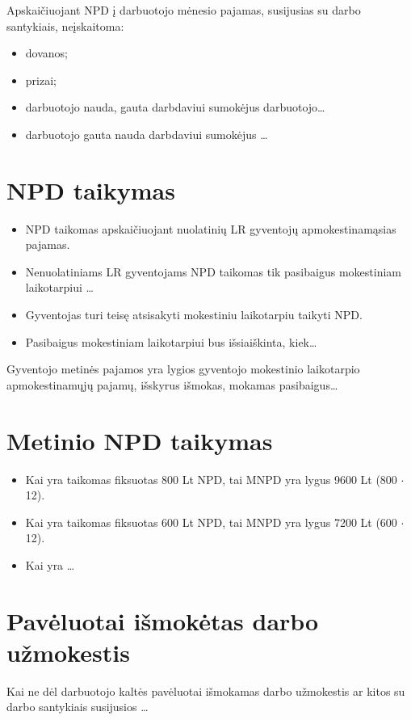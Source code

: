 Apskaičiuojant NPD į darbuotojo mėnesio pajamas, susijusias su darbo
santykiais, neįskaitoma:
\begin{itemize}
  \item dovanos;
  \item prizai;
  \item darbuotojo nauda, gauta darbdaviui sumokėjus darbuotojo…
  \item darbuotojo gauta nauda darbdaviui sumokėjus …
\end{itemize}

\section{NPD taikymas}

\begin{itemize}
  \item NPD taikomas apskaičiuojant nuolatinių LR gyventojų 
    apmokestinamąsias pajamas.
  \item Nenuolatiniams LR gyventojams NPD taikomas tik pasibaigus
    mokestiniam laikotarpiui …
  \item Gyventojas turi teisę atsisakyti mokestiniu laikotarpiu
    taikyti NPD.
  \item Pasibaigus mokestiniam laikotarpiui bus išsiaiškinta, kiek…
\end{itemize}

Gyventojo metinės pajamos yra lygios gyventojo mokestinio laikotarpio
apmokestinamųjų pajamų, išskyrus išmokas, mokamas pasibaigus…

\section{Metinio NPD taikymas}

\begin{itemize}
  \item Kai yra taikomas fiksuotas 800 Lt NPD, tai MNPD yra
    lygus 9600 Lt (800 $\cdot$ 12).
  \item Kai yra taikomas fiksuotas 600 Lt NPD, tai MNPD yra
    lygus 7200 Lt (600 $\cdot$ 12).
  \item Kai yra …
\end{itemize}

\section{Pavėluotai išmokėtas darbo užmokestis}

Kai ne dėl darbuotojo kaltės pavėluotai išmokamas darbo užmokestis ar
kitos su darbo santykiais susijusios …

